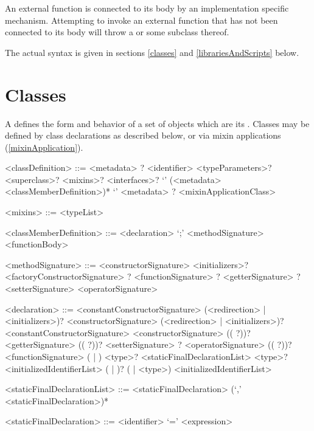 \documentclass[makeidx]{article}
\begin{document}

\LMHash{}%
An external function is connected to its body by an implementation specific mechanism.
Attempting to invoke an external function that has not been connected to its body will throw a  or some subclass thereof.

\LMHash{}%
The actual syntax is given in sections \ref{classes} and \ref{librariesAndScripts} below.


\section{Classes}

\LMHash{}%
A  defines the form and behavior of a set of objects which are its
.
Classes may be defined by class declarations as described below, or via mixin applications (\ref{mixinApplication}).

\begin{grammar}
<classDefinition> ::= <metadata> \ABSTRACT{}? \CLASS{} <identifier> <typeParameters>?
  \gnewline{} <superclass>? <mixins>? <interfaces>?
  \gnewline{} `{' (<metadata> <classMemberDefinition>)* `}'
  \alt <metadata> \ABSTRACT{}? \CLASS{} <mixinApplicationClass>

<mixins> ::= \WITH{} <typeList>

<classMemberDefinition> ::= <declaration> `;'
  \alt <methodSignature> <functionBody>

<methodSignature> ::= <constructorSignature> <initializers>?
  \alt <factoryConstructorSignature>
  \alt \STATIC{}? <functionSignature>
  \alt \STATIC{}? <getterSignature>
  \alt \STATIC{}? <setterSignature>
  \alt <operatorSignature>

<declaration> ::= <constantConstructorSignature> (<redirection> | <initializers>)?
  \alt <constructorSignature> (<redirection> | <initializers>)?
  \alt \EXTERNAL{} <constantConstructorSignature>
  \alt \EXTERNAL{} <constructorSignature>
  \alt ((\EXTERNAL{} \STATIC{}?))? <getterSignature>
  \alt ((\EXTERNAL{} \STATIC{}?))? <setterSignature>
  \alt \EXTERNAL{}? <operatorSignature>
  \alt ((\EXTERNAL{} \STATIC{}?))? <functionSignature>
  \alt \STATIC{} (\FINAL{} | \CONST{}) <type>? <staticFinalDeclarationList>
  \alt \FINAL{} <type>? <initializedIdentifierList>
  \alt (\STATIC{} | \COVARIANT{})? (\VAR{} | <type>) <initializedIdentifierList>

<staticFinalDeclarationList> ::= \gnewline{}
  <staticFinalDeclaration> (`,' <staticFinalDeclaration>)*

<staticFinalDeclaration> ::= <identifier> `=' <expression>
\end{grammar}
\end{document}
